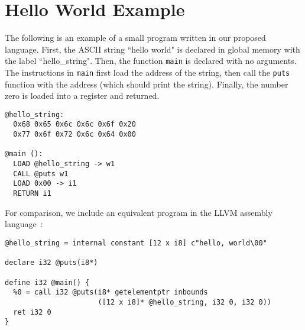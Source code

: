 \section{Hello World Example}

The following is an example of a small program written in our proposed language.
First, the ASCII string ``hello world" is declared in global memory
with the label ``hello\_string".
Then, the function \texttt{main} is declared with no arguments.
The instructions in \texttt{main} first load the address
of the string, then call the \texttt{puts} function with the address
(which should print the string). Finally, the number zero is loaded
into a register and returned.
\begin{verbatim}
@hello_string:
  0x68 0x65 0x6c 0x6c 0x6f 0x20
  0x77 0x6f 0x72 0x6c 0x64 0x00

@main ():
  LOAD @hello_string -> w1
  CALL @puts w1
  LOAD 0x00 -> i1
  RETURN i1
\end{verbatim}
For comparison, we include an equivalent program in the LLVM assembly language~\cite{lattner2008llvm}:
{\small
\begin{verbatim}
@hello_string = internal constant [12 x i8] c"hello, world\00"

declare i32 @puts(i8*)

define i32 @main() {
  %0 = call i32 @puts(i8* getelementptr inbounds
                      ([12 x i8]* @hello_string, i32 0, i32 0))
  ret i32 0
}
\end{verbatim}
}

